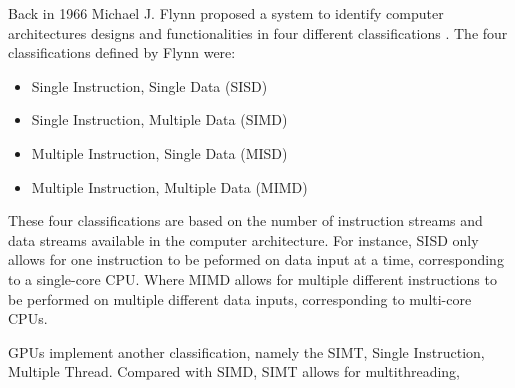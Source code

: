 


Back in 1966 Michael J. Flynn proposed  a system to identify computer architectures designs and functionalities in four different classifications \cite{Flynn1972}. 
The four classifications defined by Flynn were:

\begin{itemize}
	\item Single Instruction, Single Data (SISD)
	\item Single Instruction, Multiple Data (SIMD)
	\item Multiple Instruction, Single Data (MISD)
	\item Multiple Instruction, Multiple Data (MIMD)
\end{itemize}

These four classifications are based on the number of instruction streams and data streams available in the computer architecture.
For instance, SISD only allows for one instruction to be peformed on data input at a time, corresponding to a single-core CPU.
Where MIMD allows for multiple different instructions to be performed on multiple different data inputs, corresponding to multi-core CPUs.

GPUs implement another classification, namely the SIMT, Single Instruction, Multiple Thread.
Compared with SIMD, SIMT allows for multithreading, 
